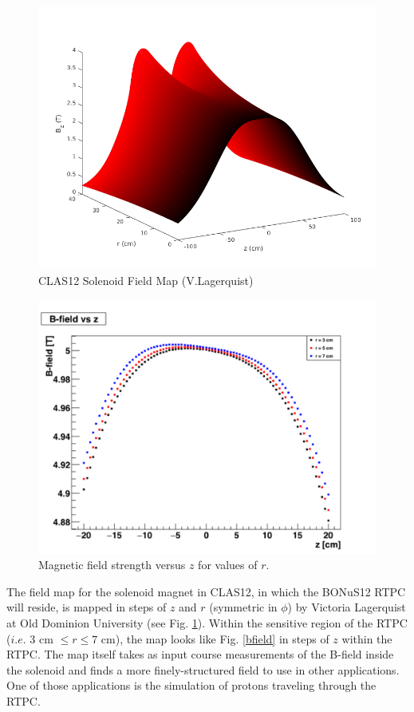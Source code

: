\begin{figure}[h!]
	\centering
	\includegraphics[width=0.8\linewidth]{figures/solenoid_map.png}
	\caption{CLAS12 Solenoid Field Map (V.Lagerquist)}
	\label{fig:clas12_solenoid_map}
\end{figure}

\begin{figure}[h!]
	\centering
	\includegraphics[width=0.8\linewidth]{figures/bfield.png}
	\caption{Magnetic field strength versus $z$ for values of $r$.}
	\label{fig:bfield}
\end{figure}

The field map for the solenoid magnet in CLAS12, in which the BONuS12 RTPC will reside, is mapped in steps of $z$ and $r$ (symmetric in $\phi$) by Victoria Lagerquist at Old Dominion University (see Fig. \ref{fig:clas12_solenoid_map}). Within the sensitive region of the RTPC ($i.e.$ $3$ cm $\leq r \leq 7$ cm),  the map looks like Fig. \ref{bfield} in steps of $z$ within the RTPC. The map itself takes as input course measurements of the B-field inside the solenoid and finds a more finely-structured field to use in other applications. One of those applications is the simulation of protons traveling through the RTPC. 

